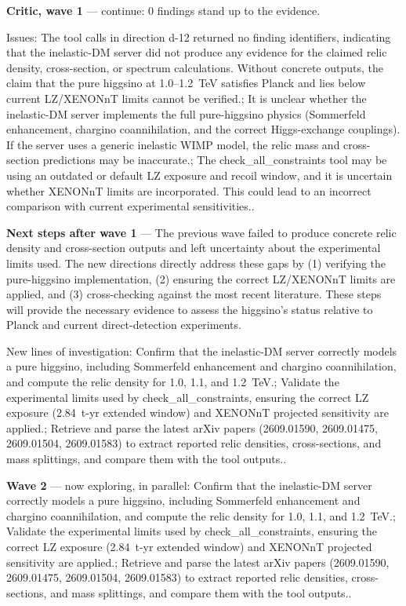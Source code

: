 \documentclass[11pt,a4paper]{article}
\begin{document}
\textbf{Critic, wave 1} --- continue: 0 findings stand up to the evidence.

Issues: The tool calls in direction d-12 returned no finding identifiers, indicating that the inelastic-DM server did not produce any evidence for the claimed relic density, cross-section, or spectrum calculations. Without concrete outputs, the claim that the pure higgsino at 1.0--1.2~TeV satisfies Planck and lies below current LZ/XENONnT limits cannot be verified.; It is unclear whether the inelastic-DM server implements the full pure-higgsino physics (Sommerfeld enhancement, chargino coannihilation, and the correct Higgs-exchange couplings). If the server uses a generic inelastic WIMP model, the relic mass and cross-section predictions may be inaccurate.; The check\_all\_constraints tool may be using an outdated or default LZ exposure and recoil window, and it is uncertain whether XENONnT limits are incorporated. This could lead to an incorrect comparison with current experimental sensitivities..

\textbf{Next steps after wave 1} --- The previous wave failed to produce concrete relic density and cross-section outputs and left uncertainty about the experimental limits used. The new directions directly address these gaps by (1) verifying the pure-higgsino implementation, (2) ensuring the correct LZ/XENONnT limits are applied, and (3) cross-checking against the most recent literature. These steps will provide the necessary evidence to assess the higgsino's status relative to Planck and current direct-detection experiments.

New lines of investigation: Confirm that the inelastic-DM server correctly models a pure higgsino, including Sommerfeld enhancement and chargino coannihilation, and compute the relic density for 1.0, 1.1, and 1.2~TeV.; Validate the experimental limits used by check\_all\_constraints, ensuring the correct LZ exposure (2.84~t-yr extended window) and XENONnT projected sensitivity are applied.; Retrieve and parse the latest arXiv papers (2609.01590, 2609.01475, 2609.01504, 2609.01583) to extract reported relic densities, cross-sections, and mass splittings, and compare them with the tool outputs..

\textbf{Wave 2} --- now exploring, in parallel: Confirm that the inelastic-DM server correctly models a pure higgsino, including Sommerfeld enhancement and chargino coannihilation, and compute the relic density for 1.0, 1.1, and 1.2~TeV.; Validate the experimental limits used by check\_all\_constraints, ensuring the correct LZ exposure (2.84~t-yr extended window) and XENONnT projected sensitivity are applied.; Retrieve and parse the latest arXiv papers (2609.01590, 2609.01475, 2609.01504, 2609.01583) to extract reported relic densities, cross-sections, and mass splittings, and compare them with the tool outputs..
\end{document}
